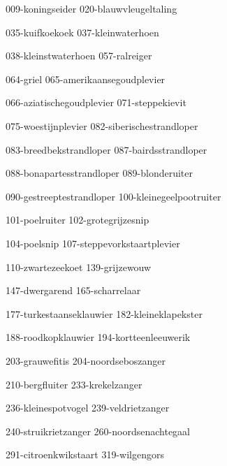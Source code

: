 

\begin{figure*}[h!]
    \centering
    \subfig
    {009-koningseider}
    {020-blauwvleugeltaling}

    \subfig
    {035-kuifkoekoek}
    {037-kleinwaterhoen}

    \subfig
    {038-kleinstwaterhoen}
    {057-ralreiger}
    
    \subfig
    {064-griel}
    {065-amerikaansegoudplevier}

    \subfig
    {066-aziatischegoudplevier}
    {071-steppekievit}

    \subfig
    {075-woestijnplevier}
    {082-siberischestrandloper}
\end{figure*}


\begin{figure*}[h!]
    \centering
    \subfig
    {083-breedbekstrandloper}
    {087-bairdsstrandloper}

    \subfig
    {088-bonapartesstrandloper}
    {089-blonderuiter}

    \subfig
    {090-gestreeptestrandloper}
    {100-kleinegeelpootruiter}

    \subfig
    {101-poelruiter}
    {102-grotegrijzesnip}

    \subfig
    {104-poelsnip}
    {107-steppevorkstaartplevier}

    \subfig
    {110-zwartezeekoet}
    {139-grijzewouw}
\end{figure*}

\begin{figure*}[h!]
    \centering
    \subfig
    {147-dwergarend}
    {165-scharrelaar}

    \subfig
    {177-turkestaanseklauwier}
    {182-kleineklapekster}

    \subfig
    {188-roodkopklauwier}
    {194-kortteenleeuwerik}

    \subfig
    {203-grauwefitis}
    {204-noordseboszanger}

    \subfig
    {210-bergfluiter}
    {233-krekelzanger}

    \subfig
    {236-kleinespotvogel}
    {239-veldrietzanger}
\end{figure*}

\begin{figure*}[h!]
    \centering
    \subfig
    {240-struikrietzanger}
    {260-noordsenachtegaal}

    \subfig
    {291-citroenkwikstaart}
    {319-wilgengors}
\end{figure*}
